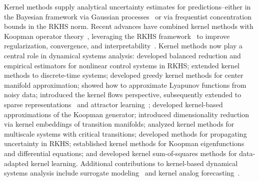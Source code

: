 \documentclass[11pt,a4paper]{article}
\begin{document}
Kernel methods supply analytical uncertainty estimates for predictions--either in the Bayesian framework via Gaussian processes~\cite{Rasmussen2006} or via frequentist concentration bounds in the RKHS norm. Recent advances have combined kernel methods with Koopman operator theory~\cite{Klus2016,Das2020,Hou2023,Ishikawa2024}, leveraging the RKHS framework~\cite{Cucker2002} to improve regularization, convergence, and interpretability~\cite{Chen2021,Owhadi2021}. Kernel methods now play a central role in dynamical systems analysis:\cite{BouvHamzi2010,BouvHamzi2012,BouvHamzi2012empirical,BouvHamzi2017SIAM,BouvHamzi2017JCD} developed balanced reduction and empirical estimators for nonlinear control systems in RKHS; \cite{HamziColoniusKernel} extended kernel methods to discrete-time systems;  \cite{Haasdonk2018,Haasdonk2021} developed greedy kernel methods for center manifold approximation;  \cite{GieslHamzi2019} showed how to approximate Lyapunov functions from noisy data; \cite{Hamzi2021} introduced the kernel flows perspective, subsequently extended to sparse representations~\cite{Yang2022} and attractor learning~\cite{Yang2023};  \cite{KlusNuskeHamzi2020} developed kernel-based approximations of the Koopman generator;  \cite{Koltai2019} introduced dimensionality reduction via kernel embeddings of transition manifolds;  \cite{HamziKuehn2018,HamziKuehnMohamed2019} analyzed kernel methods for multiscale systems with critical transitions;  \cite{Hou2024} developed methods for propagating uncertainty in RKHS;  \cite{Lee2025,Lee2024} established kernel methods for Koopman eigenfunctions and differential equations; and  \cite{Lengyel2024} developed kernel sum-of-squares methods for data-adapted kernel learning. Additional contributions to kernel-based dynamical systems analysis include surrogate modeling~\cite{Santin2019} and kernel analog forecasting~\cite{Alexander2020}.
\end{document}
